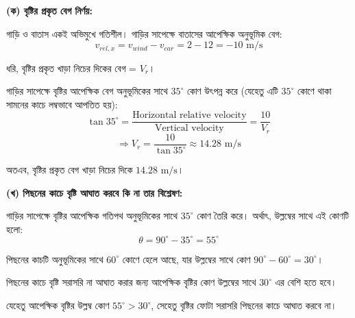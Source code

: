 \documentclass[11pt,a4paper]{article}
\begin{document}
\begin{solbox}
\begin{solbox}
\begin{center}
\end{center}

\textbf{(ক) বৃষ্টির প্রকৃত বেগ নির্ণয়:}

গাড়ি ও বাতাস একই অভিমুখে গতিশীল। গাড়ির সাপেক্ষে বাতাসের আপেক্ষিক অনুভূমিক বেগ:
$$v_{rel, x} = v_{wind} - v_{car} = 2 - 12 = -10\text{ m/s}$$

ধরি, বৃষ্টির প্রকৃত খাড়া নিচের দিকের বেগ = $V_r$।

গাড়ির সাপেক্ষে বৃষ্টির আপেক্ষিক বেগ অনুভূমিকের সাথে $35^\circ$ কোণ উৎপন্ন করে (যেহেতু এটি $35^\circ$ কোণে থাকা সামনের কাচে লম্বভাবে আপতিত হয়):
$$\tan 35^\circ = \frac{\text{Horizontal relative velocity}}{\text{Vertical velocity}} = \frac{10}{V_r}$$
$$\Rightarrow V_r = \frac{10}{\tan 35^\circ} \approx 14.28\text{ m/s}$$

অতএব, বৃষ্টির প্রকৃত বেগ খাড়া নিচের দিকে $14.28\text{ m/s}$।

\textbf{(খ) পিছনের কাচে বৃষ্টি আঘাত করবে কি না তার বিশ্লেষণ:}

গাড়ির সাপেক্ষে বৃষ্টির আপেক্ষিক গতিপথ অনুভূমিকের সাথে $35^\circ$ কোণ তৈরি করে। অর্থাৎ, উল্লম্বের সাথে এই কোণটি হলো:
$$\theta = 90^\circ - 35^\circ = 55^\circ$$

পিছনের কাচটি অনুভূমিকের সাথে $60^\circ$ কোণে হেলে আছে, যার উল্লম্বের সাথে কোণ $90^\circ - 60^\circ = 30^\circ$।

পিছনের কাচে বৃষ্টি সরাসরি না আঘাত করার জন্য আপেক্ষিক বৃষ্টির কোণ উল্লম্বের সাথে $30^\circ$ এর বেশি হতে হবে।

যেহেতু আপেক্ষিক বৃষ্টির উল্লম্ব কোণ $55^\circ > 30^\circ$, সেহেতু বৃষ্টির ফোটা সরাসরি পিছনের কাচে আঘাত করবে না।


\end{solbox}
\end{solbox}
\end{document}
